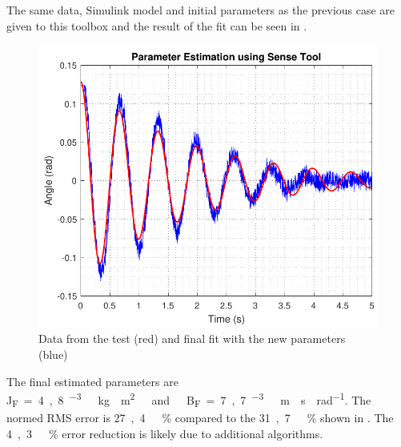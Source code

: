 The same data, Simulink model and initial parameters as the previous case are given to this toolbox and the result of the fit can be seen in . 
%
\begin{figure}[H]
	\centering
	\includegraphics[scale=0.6]{figures/SenseToolParameterEstimation}
	\caption{Data from the test (red) and final fit with the new parameters (blue)}
	\label{SenseToolParameterEstimation}
\end{figure}
%

The final estimated parameters are \si{J_F=4,8 ^{-3}\ kg \cdot m^2\ and\ B_F=7,7 ^{-3}\ m \cdot s \cdot rad^{-1}}. The normed RMS error is \si{27,4\ \%} compared to the \si{31,7\ \%} shown in . The \si{4,3\ \%} error reduction is likely due to additional algorithms.

